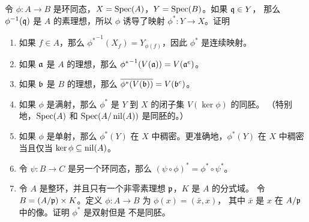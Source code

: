 \begin{problem}
  令 $\phi:A\to B$ 是环同态，$X=\operatorname{Spec}(A)$，$Y=\operatorname{Spec}(B)$。如果 $\mathfrak{q}\in Y$，
  那么 $\phi^{-1}(\mathfrak{q})$ 是 $A$ 的素理想，所以 $\phi$ 诱导了映射
  $\phi^*:Y\to X$。证明
  \begin{enumerate}
    \item 如果 $f\in A$，那么 ${\phi^*}^{-1}(X_f)=Y_{\phi(f)}$，因此
    $\phi^*$ 是连续映射。
    \item 如果 $\mathfrak{a}$ 是 $A$ 的理想，那么 ${\phi^*}^{-1}(V(\mathfrak{a}))=V(\mathfrak{a}^e)$。
    \item 如果 $\mathfrak{b}$ 是 $B$ 的理想，那么 $\overline{\phi^*(V(\mathfrak{b}))}=V(\mathfrak{b}^c)$。
    \item 如果 $\phi$ 是满射，那么 $\phi^*$ 是 $Y$ 到 $X$ 的闭子集 $V(\ker\phi)$ 的同胚。
    （特别地，$\operatorname{Spec}(A)$ 和 $\operatorname{Spec}(A/\operatorname{nil}(A))$ 是同胚的。）
    \item 如果 $\phi$ 是单射，那么 $\phi^*(Y)$ 在 $X$ 中稠密。更准确地，$\phi^*(Y)$
    在 $X$ 中稠密当且仅当 $\ker\phi\subseteq\operatorname{nil}(A)$。
    \item 令 $\psi:B\to C$ 是另一个环同态，那么 $(\psi\circ\phi)^*=\phi^*\circ\psi^*$。
    \item 令 $A$ 是整环，并且只有一个非零素理想 $\mathfrak{p}$，$K$ 是 $A$ 的分式域。
    令 $B=(A/\mathfrak{p})\times K$。定义 $\phi:A\to B$ 为 $\phi(x)=(\bar x,x)$，
    其中 $\bar x$ 是 $x$ 在 $A/\mathfrak{p}$ 中的像。证明 $\phi^*$ 是双射但是
    不是同胚。
  \end{enumerate}
\end{problem}
